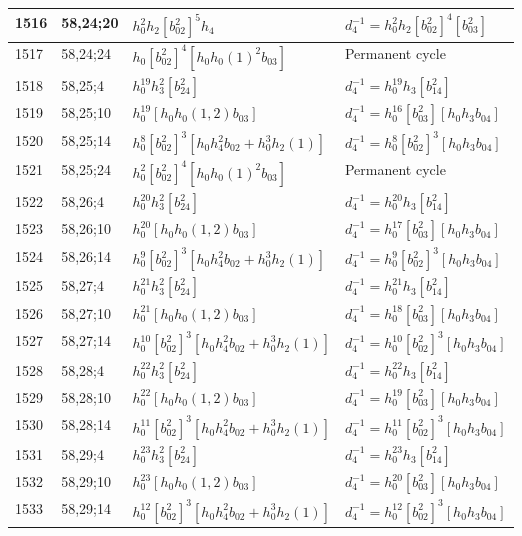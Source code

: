\documentclass{article}
\begin{document}
\begin{longtable}{|l|l|>{\raggedright\arraybackslash}p{6cm}|>{\raggedright\arraybackslash}p{6cm}|}
\hline
1516 & 58,24;20 & $h_0^2h_2[b_{02}^2]^5h_4$ & $d_{4}^{-1}=h_0^2h_2[b_{02}^2]^4[b_{03}^2]$\\
\hline
1517 & 58,24;24 & $h_0[b_{02}^2]^4[h_0h_0(1)^2b_{03}]$ & Permanent cycle\\
\hline
1518 & 58,25;4 & $h_0^{19}h_3^2[b_{24}^2]$ & $d_{4}^{-1}=h_0^{19}h_3[b_{14}^2]$\\
\hline
1519 & 58,25;10 & $h_0^{19}[h_0h_0(1, 2)b_{03}]$ & $d_{4}^{-1}=h_0^{16}[b_{03}^2][h_0h_3b_{04}]$\\
\hline
1520 & 58,25;14 & $h_0^8[b_{02}^2]^3[h_0h_4^2b_{02} + h_0^3h_2(1)]$ & $d_{4}^{-1}=h_0^8[b_{02}^2]^3[h_0h_3b_{04}]$\\
\hline
1521 & 58,25;24 & $h_0^2[b_{02}^2]^4[h_0h_0(1)^2b_{03}]$ & Permanent cycle\\
\hline
1522 & 58,26;4 & $h_0^{20}h_3^2[b_{24}^2]$ & $d_{4}^{-1}=h_0^{20}h_3[b_{14}^2]$\\
\hline
1523 & 58,26;10 & $h_0^{20}[h_0h_0(1, 2)b_{03}]$ & $d_{4}^{-1}=h_0^{17}[b_{03}^2][h_0h_3b_{04}]$\\
\hline
1524 & 58,26;14 & $h_0^9[b_{02}^2]^3[h_0h_4^2b_{02} + h_0^3h_2(1)]$ & $d_{4}^{-1}=h_0^9[b_{02}^2]^3[h_0h_3b_{04}]$\\
\hline
1525 & 58,27;4 & $h_0^{21}h_3^2[b_{24}^2]$ & $d_{4}^{-1}=h_0^{21}h_3[b_{14}^2]$\\
\hline
1526 & 58,27;10 & $h_0^{21}[h_0h_0(1, 2)b_{03}]$ & $d_{4}^{-1}=h_0^{18}[b_{03}^2][h_0h_3b_{04}]$\\
\hline
1527 & 58,27;14 & $h_0^{10}[b_{02}^2]^3[h_0h_4^2b_{02} + h_0^3h_2(1)]$ & $d_{4}^{-1}=h_0^{10}[b_{02}^2]^3[h_0h_3b_{04}]$\\
\hline
1528 & 58,28;4 & $h_0^{22}h_3^2[b_{24}^2]$ & $d_{4}^{-1}=h_0^{22}h_3[b_{14}^2]$\\
\hline
1529 & 58,28;10 & $h_0^{22}[h_0h_0(1, 2)b_{03}]$ & $d_{4}^{-1}=h_0^{19}[b_{03}^2][h_0h_3b_{04}]$\\
\hline
1530 & 58,28;14 & $h_0^{11}[b_{02}^2]^3[h_0h_4^2b_{02} + h_0^3h_2(1)]$ & $d_{4}^{-1}=h_0^{11}[b_{02}^2]^3[h_0h_3b_{04}]$\\
\hline
1531 & 58,29;4 & $h_0^{23}h_3^2[b_{24}^2]$ & $d_{4}^{-1}=h_0^{23}h_3[b_{14}^2]$\\
\hline
1532 & 58,29;10 & $h_0^{23}[h_0h_0(1, 2)b_{03}]$ & $d_{4}^{-1}=h_0^{20}[b_{03}^2][h_0h_3b_{04}]$\\
\hline
1533 & 58,29;14 & $h_0^{12}[b_{02}^2]^3[h_0h_4^2b_{02} + h_0^3h_2(1)]$ & $d_{4}^{-1}=h_0^{12}[b_{02}^2]^3[h_0h_3b_{04}]$\\
\hline

\end{longtable}
\end{document}
